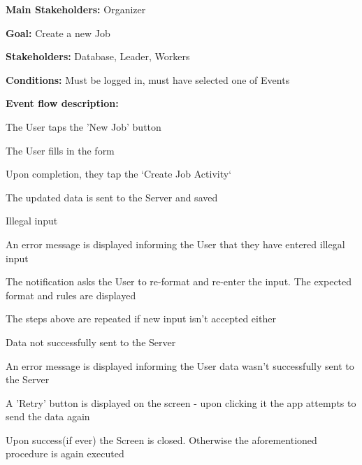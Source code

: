 			\noindent {}
			\begin{packed_item}
				\item \textbf{Main Stakeholders:} Organizer
				\item \textbf{Goal:} Create a new Job
				\item \textbf{Stakeholders: } Database, Leader, Workers
				\item \textbf{Conditions: } Must be logged in, must have selected one of Events
				\item \textbf{Event flow description: }
				\begin{packed_enum}
					\item The User taps the 'New Job' button
					\item The User fills in the form
					\item Upon completion, they tap the `Create Job Activity`
					\item The updated data is sent to the Server and saved
				\end{packed_enum}
				
				\begin{packed_item}
					\item[1.a] Illegal input
					\item[] \begin{packed_enum}
						\item An error message is displayed informing the User that they have entered illegal input
						\item The notification asks the User to re-format and re-enter the input. The expected format and rules are displayed
						\item The steps above are repeated if new input isn't accepted either
					\end{packed_enum}
					
					\item[3.a] Data not successfully sent to the Server
					\item[] \begin{packed_enum}
						\item An error message is displayed informing the User data wasn't successfully sent to the Server
						\item A 'Retry' button is displayed on the screen - upon clicking it the app attempts to send the data again
						\item Upon success(if ever) the Screen is closed. Otherwise the aforementioned procedure is again executed
					\end{packed_enum}
				\end{packed_item}
			\end{packed_item}
		

